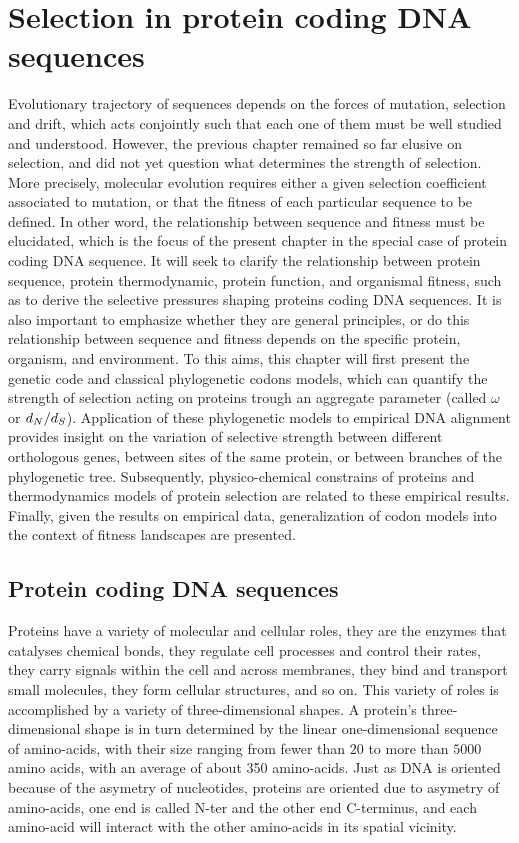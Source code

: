 \chapter{Selection in protein coding {DNA} sequences}
{
	\hypersetup{linkcolor=GREYDARK}
	\minitoc
}
\label{sec:selection}
Evolutionary trajectory of sequences depends on the forces of mutation, selection and drift, which acts conjointly such that each one of them must be well studied and understood.
However, the previous chapter remained so far elusive on selection, and did not yet question what determines the strength of selection.
More precisely, molecular evolution requires either a given selection coefficient associated to mutation, or that the fitness of each particular sequence to be defined.
In other word, the relationship between sequence and fitness must be elucidated, which is the focus of the present chapter in the special case of protein coding \acrshort{DNA} sequence.
It will seek to clarify the relationship between protein sequence, protein thermodynamic, protein function, and organismal fitness, such as to derive the selective pressures shaping proteins coding \acrshort{DNA} sequences.
It is also important to emphasize whether they are general principles, or do this relationship between sequence and fitness depends on the specific protein, organism, and environment.
To this aims, this chapter will first present the genetic code and classical phylogenetic codons models, which can quantify the strength of selection acting on proteins trough an aggregate parameter (called $\omega$ or $d_N / d_S$).
Application of these phylogenetic models to empirical DNA alignment provides insight on the variation of selective strength between different orthologous genes, between sites of the same protein, or between branches of the phylogenetic tree.
Subsequently, physico-chemical constrains of proteins and thermodynamics models of protein selection are related to these empirical results.
Finally, given the results on empirical data, generalization of codon models into the context of fitness landscapes are presented.

\section{Protein coding DNA sequences}

Proteins have a variety of molecular and cellular roles, they are the enzymes that catalyses chemical bonds, they regulate cell processes and control their rates, they carry signals within the cell and across membranes, they bind and transport small molecules, they form cellular structures, and so on.
This variety of roles is accomplished by a variety of three-dimensional shapes.
A protein's three-dimensional shape is in turn determined by the linear one-dimensional sequence of amino-acids, with their size ranging from fewer than $20$ to more than $5000$ amino acids, with an average of about 350 amino-acids.
Just as \acrshort{DNA} is oriented because of the asymetry of nucleotides, proteins are oriented due to asymetry of amino-acids, one end is called \gls{N-ter} and the other end C-terminus, and each amino-acid will interact with the other amino-acids in its spatial vicinity. 

